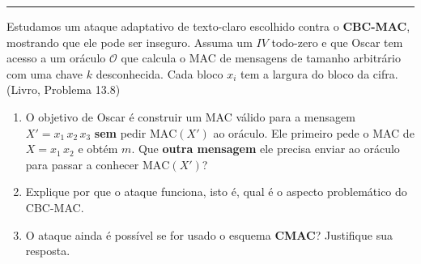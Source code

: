 \documentclass[11pt,a4paper]{article}
\newcommand{\livro}[1]{{\footnotesize\color{black!50}(Livro, Problema #1)}}
\newcommand{\exercicio}[1]{%
    \Needspace{8\baselineskip}%
    \par\vspace{1.2em}
    \noindent
    {\color{black!55}\rule[-0.25em]{3pt}{1.6em}}%
    \hspace{0.6em}{\Large\bfseries Exerc\'{i}cio #1}
    \par\vspace{-0.4em}
    \noindent{\color{black!35}\rule{\textwidth}{0.4pt}}
    \par\vspace{0.35em}
}
\begin{document}
\exercicio{5}
Estudamos um ataque adaptativo de texto-claro escolhido contra o \textbf{CBC-MAC}, mostrando que ele pode ser inseguro. Assuma um $IV$ todo-zero e que Oscar tem acesso a um or\'{a}culo $\mathcal{O}$ que calcula o MAC de mensagens de tamanho arbitr\'{a}rio com uma chave $k$ desconhecida. Cada bloco $x_i$ tem a largura do bloco da cifra. \livro{13.8}
\begin{enumerate}[label=(\alph*)]
    \item O objetivo de Oscar \'{e} construir um MAC v\'{a}lido para a mensagem $X' = x_1\,x_2\,x_3$ \textbf{sem} pedir $\text{MAC}(X')$ ao or\'{a}culo. Ele primeiro pede o MAC de $X = x_1\,x_2$ e obt\'{e}m $m$. Que \textbf{outra mensagem} ele precisa enviar ao or\'{a}culo para passar a conhecer $\text{MAC}(X')$?
    \item Explique por que o ataque funciona, isto \'{e}, qual \'{e} o aspecto problem\'{a}tico do CBC-MAC.
    \item O ataque ainda \'{e} poss\'{i}vel se for usado o esquema \textbf{CMAC}? Justifique sua resposta.
\end{enumerate}
\end{document}
